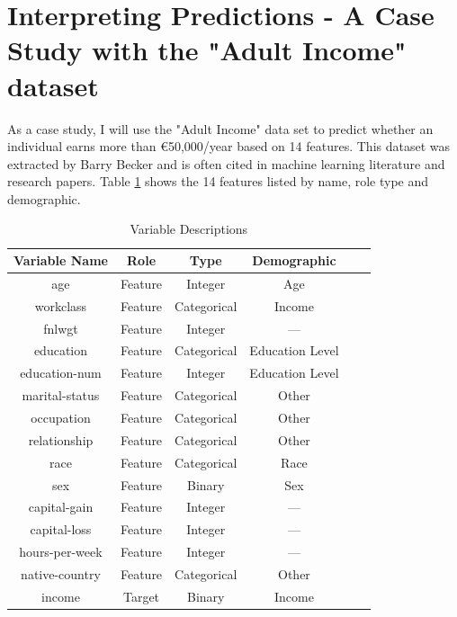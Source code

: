 \documentclass[10pt,journal,compsoc]{IEEEtran}
\begin{document}
\section{Interpreting Predictions - A Case Study with the "Adult Income" dataset}
As a case study, I will use the "Adult Income" data set\cite{misc_adult_2} to predict whether an individual earns more than €50,000/year based on 14 features. This dataset was extracted by Barry Becker and is often cited in machine learning literature and research papers. 
Table \ref{tab:variable-descriptions} shows the 14 features listed by name, role type and demographic.

\begin{table}[h]
    \centering
    \caption{Variable Descriptions}
    \begin{tabularx}{\columnwidth}{cccccc}
        \toprule
        \textbf{Variable Name} & \textbf{Role} & \textbf{Type} & \textbf{Demographic} \\
        \midrule
        age & Feature & Integer & Age \\
        workclass & Feature & Categorical & Income \\
        fnlwgt & Feature & Integer & --- \\
        education & Feature & Categorical & Education Level \\
        education-num & Feature & Integer & Education Level \\
        marital-status & Feature & Categorical & Other \\
        occupation & Feature & Categorical & Other \\
        relationship & Feature & Categorical & Other \\
        race & Feature & Categorical & Race \\
        sex & Feature & Binary & Sex \\
        capital-gain & Feature & Integer & --- \\
        capital-loss & Feature & Integer & --- \\
        hours-per-week & Feature & Integer & --- \\
        native-country & Feature & Categorical & Other \\
        income & Target & Binary & Income \\
        \bottomrule
    \end{tabularx}
    \label{tab:variable-descriptions}
\end{table}
\end{document}
